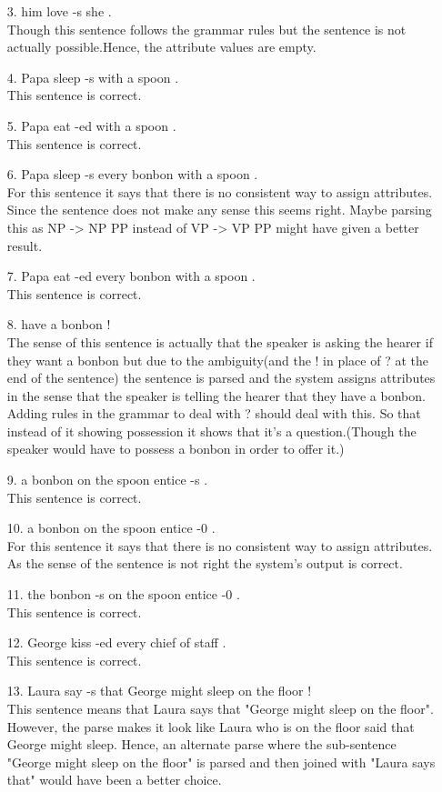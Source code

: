 \documentclass{article}
\begin{document}
\begin{enumerate}
\begin{enumerate}
\item[3.] him love -s she .
\\Though this sentence follows the grammar rules but the sentence is not actually possible.Hence, the attribute values are empty.
\item[4.] Papa sleep -s with a spoon .
\\This sentence is correct.
\item[5.] Papa eat -ed with a spoon .
\\This sentence is correct.
\item[6.] Papa sleep -s every bonbon with a spoon .
\\For this sentence it says that there is no consistent way to assign attributes. Since the sentence does not make any sense this seems right. Maybe parsing this as NP -> NP PP instead of VP -> VP PP might have given a better result.
\item[7.] Papa eat -ed every bonbon with a spoon .
\\This sentence is correct.
\item[8.] have a bonbon !
\\The sense of this sentence is actually that the speaker is asking the hearer if they want a bonbon but due to the ambiguity(and the ! in place of ? at the end of the sentence) the sentence is parsed and the system assigns attributes in the sense that the speaker is telling the hearer that they have a bonbon. Adding rules in the grammar to deal with ? should deal with this. So that instead of it showing possession it shows that it's a question.(Though the speaker would have to possess a bonbon in order to offer it.)
\item[9.] a bonbon on the spoon entice -s .
\\This sentence is correct.
\item[10.] a bonbon on the spoon entice -0 .
\\For this sentence it says that there is no consistent way to assign attributes. As the sense of the sentence is not right the system's output is correct.
\item[11.] the bonbon -s on the spoon entice -0 .
\\This sentence is correct.
\item[12.] George kiss -ed every chief of staff .
\\This sentence is correct.
\item[13.] Laura say -s that George might sleep on the floor !
\\This sentence means that Laura says that "George might sleep on the floor". However, the parse makes it look like Laura who is on the floor said that George might sleep. Hence, an alternate parse where the sub-sentence "George might sleep on the floor" is parsed and then joined with "Laura says that" would have been a better choice.

\end{enumerate}
\end{enumerate}
\end{document}
